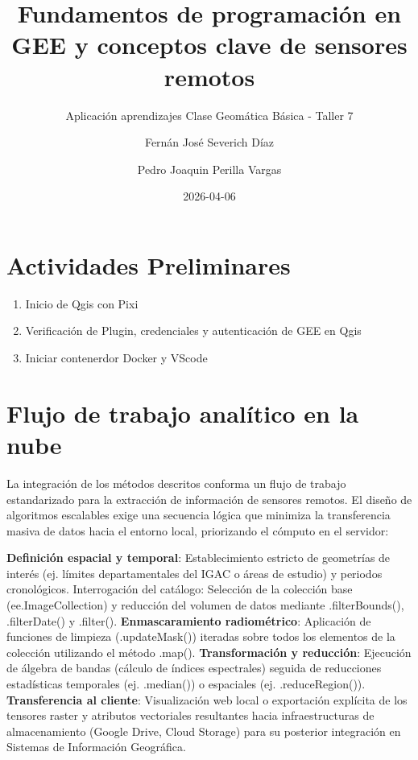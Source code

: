 \documentclass[
  letterpaper,
  DIV=11,
  numbers=noendperiod]{scrartcl}
\title{Fundamentos de programación en GEE y conceptos clave de sensores
remotos}
\subtitle{Aplicación aprendizajes Clase Geomática Básica - Taller 7}
\author{Fernán José Severich Díaz \and Pedro Joaquin Perilla Vargas}
\date{2026-04-06}
\providecommand{\tightlist}{%
  \setlength{\itemsep}{0pt}\setlength{\parskip}{0pt}}\usepackage{longtable,booktabs,array}
\renewcommand*\contentsname{Tabla de contenidos}
\newcommand\contentsname{Tabla de contenidos}
\begin{document}
\maketitle

\renewcommand*\contentsname{Tabla de contenidos}
{
\hypersetup{linkcolor=}
\setcounter{tocdepth}{3}
\tableofcontents
}
\newpage{}

\section{Actividades Preliminares}\label{actividades-preliminares}

\begin{enumerate}
\def\labelenumi{\arabic{enumi}.}
\tightlist
\item
  Inicio de Qgis con Pixi
\item
  Verificación de Plugin, credenciales y autenticación de GEE en Qgis
\item
  Iniciar contenerdor Docker y VScode
\end{enumerate}

\section{Flujo de trabajo analítico en la
nube}\label{flujo-de-trabajo-analuxedtico-en-la-nube}

La integración de los métodos descritos conforma un flujo de trabajo
estandarizado para la extracción de información de sensores remotos. El
diseño de algoritmos escalables exige una secuencia lógica que minimiza
la transferencia masiva de datos hacia el entorno local, priorizando el
cómputo en el servidor:

\textbf{Definición espacial y temporal}: Establecimiento estricto de
geometrías de interés (ej. límites departamentales del IGAC o áreas de
estudio) y periodos cronológicos. Interrogación del catálogo: Selección
de la colección base (ee.ImageCollection) y reducción del volumen de
datos mediante .filterBounds(), .filterDate() y .filter().
\textbf{Enmascaramiento radiométrico}: Aplicación de funciones de
limpieza (.updateMask()) iteradas sobre todos los elementos de la
colección utilizando el método .map(). \textbf{Transformación y
reducción}: Ejecución de álgebra de bandas (cálculo de índices
espectrales) seguida de reducciones estadísticas temporales (ej.
.median()) o espaciales (ej. .reduceRegion()). \textbf{Transferencia al
cliente}: Visualización web local o exportación explícita de los
tensores raster y atributos vectoriales resultantes hacia
infraestructuras de almacenamiento (Google Drive, Cloud Storage) para su
posterior integración en Sistemas de Información Geográfica.
\end{document}
